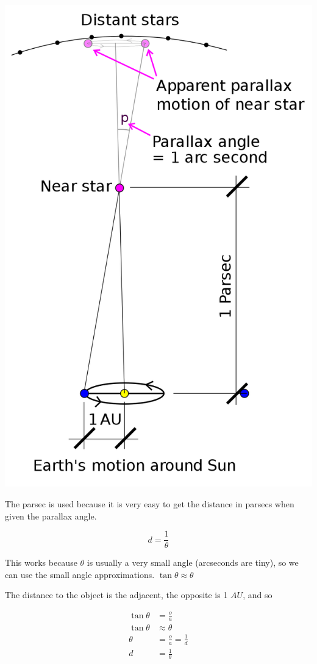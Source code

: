 \documentclass[a4paper, 12pt]{article}
\begin{document}
\includegraphics[width=\textwidth]{images/parsec.png}

The parsec is used because it is very easy to get the distance in parsecs when given the parallax angle.

$$
d = \frac{1}{\theta}
$$

This works because $\theta$ is usually a very small angle (arcseconds are tiny), so we can use the small angle approximations. $\tan{\theta} \approx \theta$

The distance to the object is the adjacent, the opposite is 1 $AU$, and so

\begin{align*}
	\tan{\theta} &= \frac{o}{a} \\
	\tan{\theta} & \approx \theta \\
	\theta &= \frac{o}{a} = \frac{1}{d} \\
	d &= \frac{1}{\theta}
\end{align*}
\end{document}
